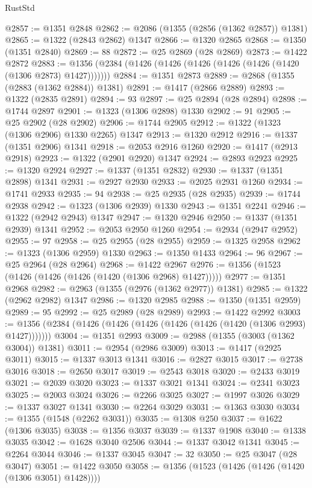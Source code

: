 \begin{lexlean}{RustStd}
\begin{coremodule}
@2857 := @1351 @2848
@2862 := @2086 (@1355 (@2856 (@1362 @2857)) @1381)
@2865 := @1322 (@2843 @2862) @1347
@2866 := @1320 @2865
@2868 := @1350 (@1351 @2840)
@2869 := 88
@2872 := @25 @2869 (@28 @2869)
@2873 := @1422 @2872
@2883 := @1356 (@2384 (@1426 (@1426 (@1426 (@1426 (@1426 (@1420 (@1306 @2873) @1427)))))))
@2884 := @1351 @2873
@2889 := @2868 (@1355 (@2883 (@1362 @2884)) @1381)
@2891 := @1417 (@2866 @2889)
@2893 := @1322 (@2835 @2891)
@2894 := 93
@2897 := @25 @2894 (@28 @2894)
@2898 := @1744 @2897
@2901 := @1323 (@1306 @2898) @1330
@2902 := 91
@2905 := @25 @2902 (@28 @2902)
@2906 := @1744 @2905
@2912 := @1322 (@1323 (@1306 @2906) @1330 @2265) @1347
@2913 := @1320 @2912
@2916 := @1337 (@1351 @2906) @1341
@2918 := @2053 @2916 @1260
@2920 := @1417 (@2913 @2918)
@2923 := @1322 (@2901 @2920) @1347
@2924 := @2893 @2923
@2925 := @1320 @2924
@2927 := @1337 (@1351 @2832)
@2930 := @1337 (@1351 @2898) @1341
@2931 := @2927 @2930
@2933 := @2025 @2931 @1260
@2934 := @1741 @2933
@2935 := 94
@2938 := @25 @2935 (@28 @2935)
@2939 := @1744 @2938
@2942 := @1323 (@1306 @2939) @1330
@2943 := @1351 @2241
@2946 := @1322 (@2942 @2943) @1347
@2947 := @1320 @2946
@2950 := @1337 (@1351 @2939) @1341
@2952 := @2053 @2950 @1260
@2954 := @2934 (@2947 @2952)
@2955 := 97
@2958 := @25 @2955 (@28 @2955)
@2959 := @1325 @2958
@2962 := @1323 (@1306 @2959) @1330
@2963 := @1350 @1433
@2964 := 96
@2967 := @25 @2964 (@28 @2964)
@2968 := @1422 @2967
@2976 := @1356 (@1523 (@1426 (@1426 (@1426 (@1420 (@1306 @2968) @1427)))))
@2977 := @1351 @2968
@2982 := @2963 (@1355 (@2976 (@1362 @2977)) @1381)
@2985 := @1322 (@2962 @2982) @1347
@2986 := @1320 @2985
@2988 := @1350 (@1351 @2959)
@2989 := 95
@2992 := @25 @2989 (@28 @2989)
@2993 := @1422 @2992
@3003 := @1356 (@2384 (@1426 (@1426 (@1426 (@1426 (@1426 (@1420 (@1306 @2993) @1427)))))))
@3004 := @1351 @2993
@3009 := @2988 (@1355 (@3003 (@1362 @3004)) @1381)
@3011 := @2954 (@2986 @3009)
@3013 := @1417 (@2925 @3011)
@3015 := @1337 @3013 @1341
@3016 := @2827 @3015
@3017 := @2738 @3016
@3018 := @2650 @3017
@3019 := @2543 @3018
@3020 := @2433 @3019
@3021 := @2039 @3020
@3023 := @1337 @3021 @1341
@3024 := @2341 @3023
@3025 := @2003 @3024
@3026 := @2266 @3025
@3027 := @1997 @3026
@3029 := @1337 @3027 @1341
@3030 := @2264 @3029
@3031 := @1363 @3030
@3034 := @1355 (@1548 (@2262 @3031))
@3035 := @1308 @250
@3037 := @1622 (@1306 @3035)
@3038 := @1356 @3037
@3039 := @1337 @1908
@3040 := @1338 @3035
@3042 := @1628 @3040 @2506
@3044 := @1337 @3042 @1341
@3045 := @2264 @3044
@3046 := @1337 @3045
@3047 := 32
@3050 := @25 @3047 (@28 @3047)
@3051 := @1422 @3050
@3058 := @1356 (@1523 (@1426 (@1426 (@1420 (@1306 @3051) @1428))))

\end{coremodule}
\end{lexlean}

